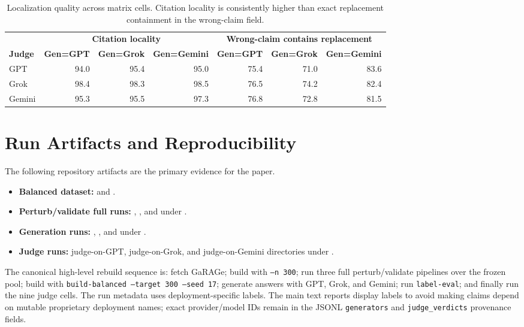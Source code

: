 \documentclass[11pt]{article}
\begin{document}
\begin{table}[h]
\centering
\small
\begin{tabular}{lrrrrrr}
\toprule
 & \multicolumn{3}{c}{\textbf{Citation locality}} & \multicolumn{3}{c}{\textbf{Wrong-claim contains replacement}} \\
\cmidrule(lr){2-4}\cmidrule(lr){5-7}
\textbf{Judge} & \textbf{Gen=GPT} & \textbf{Gen=Grok} & \textbf{Gen=Gemini} & \textbf{Gen=GPT} & \textbf{Gen=Grok} & \textbf{Gen=Gemini} \\
\midrule
GPT & 94.0 & 95.4 & 95.0 & 75.4 & 71.0 & 83.6 \\
Grok & 98.4 & 98.3 & 98.5 & 76.5 & 74.2 & 82.4 \\
Gemini & 95.3 & 95.5 & 97.3 & 76.8 & 72.8 & 81.5 \\
\bottomrule
\end{tabular}
\caption{Localization quality across matrix cells. Citation locality is consistently higher than exact replacement containment in the wrong-claim field.}
\end{table}

\section{Run Artifacts and Reproducibility}
\label{app:repro}

The following repository artifacts are the primary evidence for the paper.

\begin{itemize}[leftmargin=*]
  \item \textbf{Balanced dataset:}  and .
  \item \textbf{Perturb/validate full runs:} , , and  under .
  \item \textbf{Generation runs:} , , and  under .
  \item \textbf{Judge runs:} judge-on-GPT, judge-on-Grok, and judge-on-Gemini directories under .
\end{itemize}

The canonical high-level rebuild sequence is: fetch GaRAGe; build  with \texttt{--n 300}; run three full perturb/validate pipelines over the frozen pool; build  with \texttt{build-balanced --target 300 --seed 17}; generate answers with GPT, Grok, and Gemini; run \texttt{label-eval}; and finally run the nine judge cells. The run metadata uses deployment-specific labels. The main text reports display labels to avoid making claims depend on mutable proprietary deployment names; exact provider/model IDs remain in the JSONL \texttt{generators} and \texttt{judge\_verdicts} provenance fields.
\end{document}
